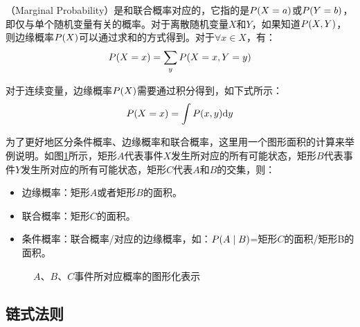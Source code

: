 （Marginal Probability）是和联合概率对应的，它指的是${P}(X=a)$或${P}(Y=b)$，即仅与单个随机变量有关的概率。对于离散随机变量$X$和$Y$，如果知道${P}(X,Y)$，则边缘概率${P}(X)$可以通过求和的方式得到。对于$\forall x \in X $，有：
\begin{eqnarray}
{P}(X=x)=\sum_{y}  {P}(X=x,Y=y)
\label{eq:2-3}
\end{eqnarray}

\parinterval 对于连续变量，边缘概率${P}(X)$需要通过积分得到，如下式所示：
\begin{eqnarray}
{P}(X=x)=\int {P}(x,y)\textrm{d}y
\label{eq:2-4}
\end{eqnarray}

\parinterval 为了更好地区分条件概率、边缘概率和联合概率，这里用一个图形面积的计算来举例说明。如图\ref{fig:2-2}所示，矩形$A$代表事件$X$发生所对应的所有可能状态，矩形$B$代表事件$Y$发生所对应的所有可能状态，矩形$C$代表$A$和$B$的交集，则：

\begin{itemize}
\vspace{0.5em}
\item 边缘概率：矩形$A$或者矩形$B$的面积。
\vspace{0.5em}
\item 联合概率：矩形$C$的面积。
\vspace{0.5em}
\item 条件概率：联合概率/对应的边缘概率，如：${P}(A \mid B)$=矩形$C$的面积/矩形B的面积。
\vspace{0.5em}
\end{itemize}

\begin{figure}[htp]
\centering

\caption{$A$、$B$、$C$事件所对应概率的图形化表示}
\label{fig:2-2}
\end{figure}


\subsection{链式法则} \label{sec:chain-rule}

